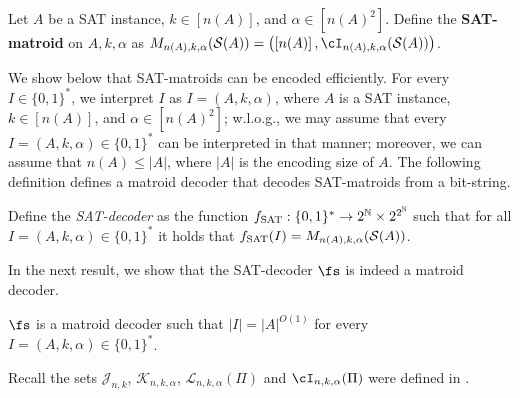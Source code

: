 	\begin{definition}
		\label{def:SATmatroid}
		Let $A$ be a \textnormal{SAT} instance, $k \in \left[n(A)\right]$, and $\alpha \in \left[  {n(A)}^{2}\right]$. Define the {\bf SAT-matroid} on $A,k,\alpha$ as $M_{n(A),k,\alpha}(\mathcal{S}(A)) = \left(\left[n(A)\right],\cI_{n(A),k,\alpha}(\mathcal{S}(A))\right)$. 
	\end{definition}
	We show below that SAT-matroids can be  encoded efficiently. %
	For every $I \in \{0,1\}^*$, we interpret $I$ as $I = (A,k,\alpha)$, where $A$ is a \textnormal{SAT} instance, $k \in \left[n(A) \right]$, and $\alpha \in \left[ {n(A)}^2 \right]$; w.l.o.g., we may assume that every $I = (A,k,\alpha) \in \{0,1\}^*$ can be interpreted in that manner; moreover, we can assume that $n(A) \leq |A|$, where $|A|$ is the encoding size of $A$. The following definition defines a matroid decoder that decodes SAT-matroids from a bit-string. %
	\begin{definition}
		\label{def:SATencoder}
		Define the {\em SAT-decoder}  as the function $f_{\textnormal{SAT}}:\{0,1\}^* \rightarrow 2^\mathbb{N} \times 2^{2^{\mathbb{N}}}$ such that for all $I = (A,k,\alpha) \in \{0,1\}^*$ it holds that $f_{\textnormal{SAT}}(I) = M_{n(A),k,\alpha}(\mathcal{S}(A))$. 
	\end{definition}
	In the next result, we show that the SAT-decoder $\fs$ is indeed a  matroid decoder.
	\begin{lemma}
		\label{lem:encodable}
		$\fs$ is a matroid decoder such that $|I| = |A|^{O(1)}$ for every $I=(A,k,\alpha) \in \{0,1\}^*$. 
	\end{lemma}
	Recall the sets  $\mathcal{J}_{n,k}$,  $\mathcal{K}_{n,k,\alpha}$, $\mathcal{L}_{n,k,\alpha}(\Pi)$ and $\cI_{n,k,\alpha}(\Pi)$ were defined in  .
